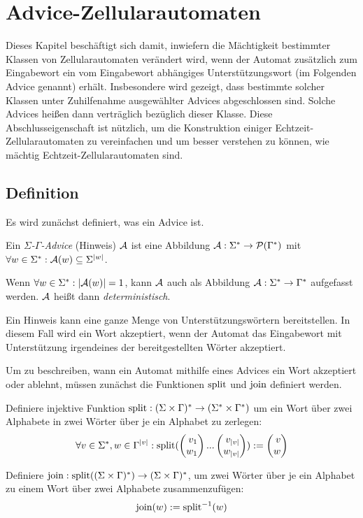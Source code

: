 \chapter{Advice-Zellularautomaten}
\label{chap:AdvAuto}

Dieses Kapitel beschäftigt sich damit, inwiefern die Mächtigkeit bestimmter Klassen von Zellularautomaten verändert wird,
wenn der Automat zusätzlich zum Eingabewort ein vom Eingabewort abhängiges Unterstützungswort (im Folgenden Advice genannt) erhält.
Insbesondere wird gezeigt, dass bestimmte solcher Klassen unter Zuhilfenahme ausgewählter Advices abgeschlossen sind.
Solche Advices heißen dann verträglich bezüglich dieser Klasse.
Diese Abschlusseigenschaft ist nützlich, um die Konstruktion einiger Echtzeit-Zellularautomaten zu vereinfachen und um besser verstehen zu können,
wie mächtig Echtzeit-Zellularautomaten sind.

\section{Definition}

Es wird zunächst definiert, was ein Advice ist.

\begin{definition}
    Ein \emph{$\Sigma$-$\Gamma$-Advice} (Hinweis) $\mathcal{A}$ ist eine Abbildung
        $\mathcal{A}: \Sigma^* \to \mathcal{P}(\Gamma^*)$ mit $\forall w \in \Sigma^*: \mathcal{A}(w) \subseteq \Sigma^{|w|}$.
    
    Wenn $\forall w \in \Sigma^*: |\mathcal{A}(w)| = 1$, kann $\mathcal{A}$ auch
    als Abbildung $\mathcal{A} : \Sigma^* \to \Gamma^*$ aufgefasst werden.
    $\mathcal{A}$ heißt dann \emph{deterministisch}.

    Ein Hinweis kann eine ganze Menge von Unterstützungswörtern bereitstellen.
    In diesem Fall wird ein Wort akzeptiert,
    wenn der Automat das Eingabewort mit Unterstützung irgendeines der bereitgestellten Wörter akzeptiert.
\end{definition}

Um zu beschreiben, wann ein Automat mithilfe eines Advices ein Wort akzeptiert oder ablehnt,
müssen zunächst die Funktionen $\textrm{split}$ und $\textrm{join}$ definiert werden.

\begin{definition}
    Definiere injektive Funktion $\textrm{split}: (\Sigma \times \Gamma)^* \to (\Sigma^* \times \Gamma^*)$
    um ein Wort über zwei Alphabete in zwei Wörter über je ein Alphabet zu zerlegen:
    \[
        \forall v \in \Sigma^*, w \in \Gamma^{|v|}: \splitw(\Spvek{v_1; w_1}...\Spvek{v_{|v|}; w_{|v|}}) := \Spvek{v; w}
    \]
    
    Definiere $\textrm{join}: \textrm{split}((\Sigma \times \Gamma)^*) \to (\Sigma \times \Gamma)^*$,
    um zwei Wörter über je ein Alphabet zu einem Wort über zwei Alphabete zusammenzufügen:
    \[
        \textrm{join}(w) := \textrm{split}^{-1}(w)
    \]
\end{definition}

